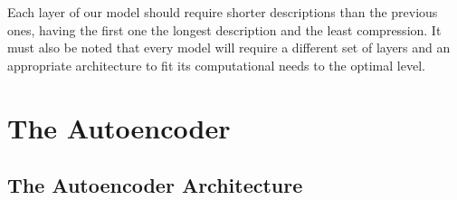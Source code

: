 Each layer of our model should require shorter descriptions than the previous ones, having the first one the longest description and the least compression. It must also be noted that every model will require a different set of layers and an appropriate architecture to fit its computational needs to the optimal level. \par

\section{The Autoencoder}

\subsection{The Autoencoder Architecture}

